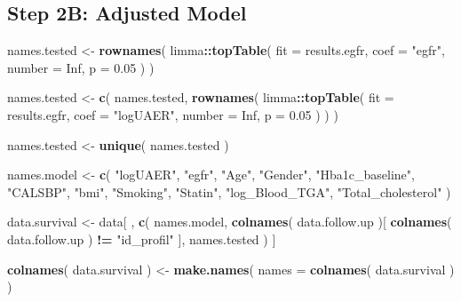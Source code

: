 \documentclass[]{article}
\newenvironment{Shaded}{\begin{snugshade}}{\end{snugshade}}
\newcommand{\DataTypeTok}[1]{\textcolor[rgb]{0.13,0.29,0.53}{#1}}
\newcommand{\FloatTok}[1]{\textcolor[rgb]{0.00,0.00,0.81}{#1}}
\newcommand{\KeywordTok}[1]{\textcolor[rgb]{0.13,0.29,0.53}{\textbf{#1}}}
\newcommand{\NormalTok}[1]{#1}
\newcommand{\OperatorTok}[1]{\textcolor[rgb]{0.81,0.36,0.00}{\textbf{#1}}}
\newcommand{\OtherTok}[1]{\textcolor[rgb]{0.56,0.35,0.01}{#1}}
\newcommand{\StringTok}[1]{\textcolor[rgb]{0.31,0.60,0.02}{#1}}
\begin{document}
\newpage

\hypertarget{step-2b-adjusted-model}{%
\subsection{Step 2B: Adjusted Model}\label{step-2b-adjusted-model}}

\begin{Shaded}
\begin{Highlighting}[]
\NormalTok{names.tested <-}\StringTok{ }
\StringTok{  }\KeywordTok{rownames}\NormalTok{( }
\NormalTok{    limma}\OperatorTok{::}\KeywordTok{topTable}\NormalTok{( }
      \DataTypeTok{fit =}\NormalTok{ results.egfr, }
      \DataTypeTok{coef =} \StringTok{"egfr"}\NormalTok{,}
      \DataTypeTok{number =} \OtherTok{Inf}\NormalTok{,}
      \DataTypeTok{p =} \FloatTok{0.05}
\NormalTok{    )}
\NormalTok{  )}

\NormalTok{names.tested <-}
\StringTok{  }\KeywordTok{c}\NormalTok{( }
\NormalTok{    names.tested,}
    \KeywordTok{rownames}\NormalTok{( }
\NormalTok{      limma}\OperatorTok{::}\KeywordTok{topTable}\NormalTok{(}
        \DataTypeTok{fit =}\NormalTok{ results.egfr, }
        \DataTypeTok{coef =} \StringTok{"logUAER"}\NormalTok{,}
        \DataTypeTok{number =} \OtherTok{Inf}\NormalTok{,}
        \DataTypeTok{p =} \FloatTok{0.05}
\NormalTok{      )}
\NormalTok{    )}
\NormalTok{  )}

\NormalTok{names.tested <-}\StringTok{ }\KeywordTok{unique}\NormalTok{( names.tested )}

\NormalTok{names.model <-}
\StringTok{  }\KeywordTok{c}\NormalTok{(}
    \StringTok{"logUAER"}\NormalTok{,}
    \StringTok{"egfr"}\NormalTok{,}
    \StringTok{"Age"}\NormalTok{, }\StringTok{"Gender"}\NormalTok{,}
    \StringTok{"Hba1c_baseline"}\NormalTok{,}
    \StringTok{"CALSBP"}\NormalTok{,}
    \StringTok{"bmi"}\NormalTok{,}
    \StringTok{"Smoking"}\NormalTok{,}
    \StringTok{"Statin"}\NormalTok{,}
    \StringTok{"log_Blood_TGA"}\NormalTok{,}
    \StringTok{"Total_cholesterol"}
\NormalTok{  )}

\NormalTok{data.survival <-}\StringTok{ }
\StringTok{  }\NormalTok{data[ , }
        \KeywordTok{c}\NormalTok{( }
\NormalTok{          names.model, }
          \KeywordTok{colnames}\NormalTok{( data.follow.up )[ }\KeywordTok{colnames}\NormalTok{( data.follow.up ) }\OperatorTok{!=}\StringTok{ "id_profil"}\NormalTok{ ], }
\NormalTok{          names.tested}
\NormalTok{        )}
\NormalTok{        ]}

\KeywordTok{colnames}\NormalTok{( data.survival ) <-}\StringTok{ }\KeywordTok{make.names}\NormalTok{( }\DataTypeTok{names =} \KeywordTok{colnames}\NormalTok{( data.survival ) )}


\end{Highlighting}
\end{Shaded}
\end{document}

